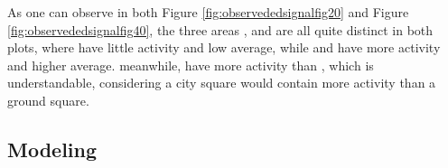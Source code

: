 \documentclass[12pt,a4paper,twoside]{article}
\begin{document}
\noindent As one can observe in both Figure \ref{fig:observededsignalfig20} and Figure \ref{fig:observededsignalfig40},
the three areas ,  and  are all quite distinct in both plots, where  have little
activity and low average, while  and  have more activity and higher average. meanwhile, 
have more activity than , which is understandable, considering a city square would contain more activity than a
ground square.

\newpage

\subsection{Modeling}
\label{ssec:modeling}
\end{document}
